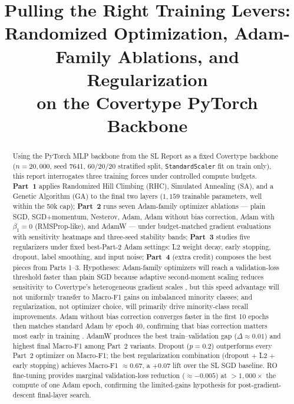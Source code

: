 \documentclass[conference]{IEEEtran}
\title{\color{denimdark}\textbf{Pulling the Right Training Levers:\\
Randomized Optimization, Adam-Family Ablations, and Regularization\\
on the Covertype PyTorch Backbone}}
\author{
  \IEEEauthorblockN{Timothy Leung}
  \IEEEauthorblockA{Georgia Institute of Technology, OMSCS\\
  CS 7641 --- Machine Learning, Summer 2026\\
  gtID 904150400 \quad \texttt{tleung37@gatech.edu}}
}
\begin{document}
\graphicspath{{.../results/figures/}{../results/figures/}}
\maketitle
\thispagestyle{plain}

\begin{abstract}
Using the PyTorch MLP backbone from the SL Report as a fixed Covertype backbone
($n{=}20{,}000$, seed 7641, 60/20/20 stratified split, \texttt{StandardScaler}
fit on train only), this report interrogates three training forces under
controlled compute budgets.
\textbf{Part~1} applies Randomized Hill Climbing (RHC), Simulated Annealing
(SA), and a Genetic Algorithm (GA) to the final two layers
($1{,}159$ trainable parameters, well within the 50k cap);
\textbf{Part~2} runs seven Adam-family optimizer ablations ---
plain SGD, SGD+momentum, Nesterov, Adam, Adam without bias correction,
Adam with $\beta_1{=}0$ (RMSProp-like), and AdamW --- under budget-matched
gradient evaluations with sensitivity heatmaps and three-seed stability bands;
\textbf{Part~3} studies five regularizers under fixed best-Part-2 Adam settings:
L2 weight decay, early stopping, dropout, label smoothing, and input noise;
\textbf{Part~4} (extra credit) composes the best pieces from Parts 1--3.
Hypotheses: Adam-family optimizers will reach a validation-loss threshold
faster than plain SGD because adaptive second-moment scaling reduces sensitivity
to Covertype's heterogeneous gradient scales \cite{kingma2014adam}, but this
speed advantage will not uniformly transfer to Macro-F1 gains on imbalanced
minority classes; and regularization, not optimizer choice, will primarily
drive minority-class recall improvements.
Adam without bias correction converges faster in the first 10 epochs then matches
standard Adam by epoch 40, confirming that bias correction matters most
early in training \cite{kingma2014adam}.
AdamW produces the best train--validation gap ($\Delta{\approx}0.01$) and
highest final Macro-F1 among Part~2 variants.
Dropout ($p{=}0.2$) outperforms every Part~2 optimizer on Macro-F1; the
best regularization combination (dropout $+$ L2 $+$ early stopping) achieves
Macro-F1 ${\approx}0.67$, a $+0.07$ lift over the SL SGD baseline.
RO fine-tuning provides marginal validation-loss reduction (${\approx}{-}0.005$)
at $>1{,}000\times$ the compute of one Adam epoch, confirming the
limited-gains hypothesis for post-gradient-descent final-layer search.
\end{abstract}
\end{document}
